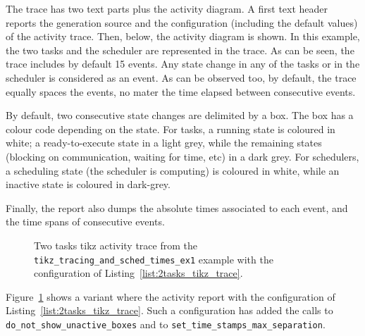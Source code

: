 The trace has two text parts plus the activity diagram.
A first text header reports the generation source and the configuration (including the default values) of the activity trace.
%
Then, below, the activity diagram is shown.
In this example, the two tasks and the scheduler are represented in the trace.
As can be seen, the trace includes by default 15 events.
Any state change in any of the tasks or in the scheduler is considered as an event.
As can be observed too, by default, the trace equally spaces the events, no mater the time elapsed between consecutive events.

By default, two consecutive state changes are delimited by a box.
The box has a colour code depending on the state.
For tasks, a running state is coloured in white; a ready-to-execute state in a light grey, while the
remaining states (blocking on communication, waiting for time, etc) in a dark grey.
For schedulers, a scheduling state (the scheduler is computing) is coloured in white,
while an inactive state is coloured in dark-grey.

Finally, the report also dumps the absolute times associated to each event, 
and the time spans of consecutive events.

\begin{figure}[htbp]
\centering
\caption{Two tasks tikz activity trace from the \texttt{tikz\_tracing\_and\_sched\_times\_ex1} example with the configuration of Listing~\ref{list:2tasks_tikz_trace}.} 
\label{fig:2tasks_tikz_trace_2}
\end{figure}

Figure~\ref{fig:2tasks_tikz_trace_2} shows a variant where the activity report with the configuration of Listing~\ref{list:2tasks_tikz_trace}.
Such a configuration has added the calls to \texttt{do\_not\_show\_unactive\_boxes} and to \texttt{set\_time\_stamps\_max\_separation}.


